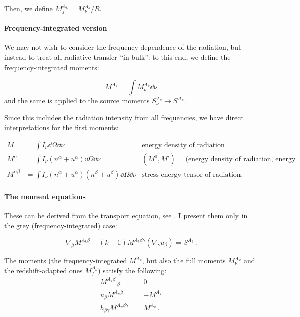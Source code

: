 \documentclass[main.tex]{subfiles}
\begin{document}
Then, we define \( M_f ^{A_k} =  M_{\nu} ^{A_k} / R\).

\paragraph{Frequency-integrated version}

We may not wish to consider the frequency dependence of the radiation, but instead to treat all radiative transfer ``in bulk'': to this end, we define the frequency-integrated moments:

\begin{equation}
   M ^{A_k} = \int M^{A_k} _\nu \dd{\nu}
\end{equation}
and the same is applied to the source moments \(S_\nu^{A_k} \rightarrow S^{A_k}\).

Since this includes the radiation intensity from all frequencies, we have direct interpretations for the first moments:

\begin{subequations}
\begin{align}
   M &= \int  I_\nu \dd{\Omega} \dd{\nu}   & \text{energy density of radiation}  \\
   M^\alpha &= \int I_\nu (n^\alpha + u^\alpha)\dd{\Omega} \dd{\nu}   & (M^0, M^i) = \text{(energy density of radiation, energy flux)}  \\
   M^{\alpha\beta} &= \int I_\nu (n^\alpha + u^\alpha)(n^\beta + u^\beta)\dd{\Omega} \dd{\nu}   & \text{stress-energy tensor of radiation.}
\end{align}
\end{subequations}

\paragraph{The moment equations}

These can be derived from the transport equation, see \cite[eq. 3.14]{Thorne:1981feb}. I present them only in the grey (frequency-integrated) case:

\begin{equation} \label{eq:grey-moment-equations}
  \nabla_\beta M^{A_k \beta} - (k-1) M^{A_k \beta \gamma} (\nabla_ \gamma u_\beta)= S^{A_k} \,.
\end{equation}

The moments (the frequency-integrated \(M^{A_k}\), but also the full moments \(M^{A_k}_\nu\) and the redshift-adapted ones \(M^{A_k}_f\)) satisfy the following:
\begin{subequations}
\begin{align}
  M^{A_k \beta}\,_\beta &= 0 \\
  u_\beta M^{A_k \beta} &= -M^{A_k} \\
  h_{\beta \gamma} M^{A_k \beta \gamma} &= M^{A_k} \,.
\end{align}
\end{subequations}
\end{document}
